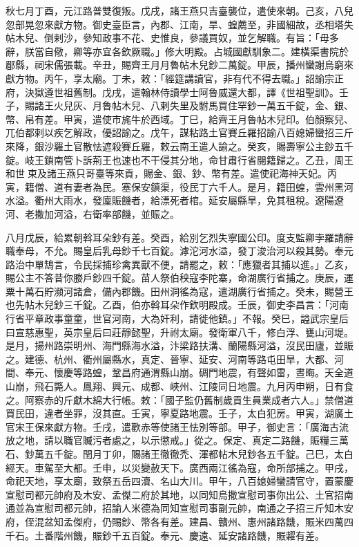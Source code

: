 \begin{pinyinscope}
 秋七月丁酉，元江路普雙復叛。戊戌，諸王燕只吉臺襲位，遣使來朝。己亥，八兒忽部晃忽來獻方物。御史臺臣言，內郡、江南，旱、蝗薦至，非國細故，丞相塔失帖木兒、倒剌沙，參知政事不花、史惟良，參議買奴，並乞解職。有旨：「毋多辭，朕當自儆，卿等亦宜各欽厥職。」修大明殿。占城國獻馴象二。建橫渠書院於郿縣，祠宋儒張載。辛丑，賜齊王月月魯帖木兒鈔二萬錠。甲辰，播州蠻謝烏窮來獻方物。丙午，享太廟。丁未，敕：「經筵講讀官，非有代不得去職。」詔諭宗正府，決獄遵世祖舊制。戊戌，遣翰林侍讀學士阿魯威還大都，譯《世祖聖訓》。壬子，賜諸王火兒灰、月魯帖木兒、八剌失里及駙馬買住罕鈔一萬五千錠，金、銀、幣、帛有差。甲寅，遣使市旄牛於西域。丁巳，給齊王月魯帖木兒印。伯顏察兒、兀伯都剌以疾乞解政，優詔諭之。戊午，謀粘路土官賽丘羅招諭八百媳婦蠻招三斤來降，銀沙羅土官散怯遮殺賽丘羅，敕云南王遣人諭之。癸亥，賜壽寧公主鈔五千錠。岐王鎖南管卜訴荊王也速也不干侵其分地，命甘肅行省閱籍歸之。乙丑，周王和世束及諸王燕只哥臺等來貢，賜金、銀、鈔、幣有差。遣使祀海神天妃。丙寅，籍僧、道有妻者為民。塞保安鎮渠，役民丁六千人。是月，籍田蝗，雲州黑河水溢。衢州大雨水，發廩賑饑者，給漂死者棺。延安屬縣旱，免其租稅。遼陽遼河、老撒加河溢，右衛率部饑，並賑之。



 八月戊辰，給累朝斡耳朵鈔有差。癸酉，給別乞烈失寧國公印。度支監卿孛羅請辭職奉母，不允。賜皇后乳母鈔千七百錠。滹沱河水溢，發丁浚治河以殺其勢。奉元路治中單鵠言，令民採捕珍禽異獸不便，請罷之，敕：「應獵者其捕以進。」乙亥，賜公主不答昔你媵戶鈔四千錠。苗人祭伯秧寇李陀寨，命湖廣行省捕之。庚辰，運粟十萬石貯瀕河諸倉，備內郡饑。田州洞徭為寇，遣湖廣行省捕之。癸未，賜營王也先帖木兒鈔三千錠。乙酉，伯亦斡耳朵作欽明殿成。壬辰，御史李昌言：「河南行省平章政事童童，世官河南，大為奸利，請徙他鎮。」不報。癸巳，謚武宗皇后曰宣慈惠聖，英宗皇后曰莊靜懿聖，升祔太廟。發衛軍八千，修白浮、甕山河堤。是月，揚州路崇明州、海門縣海水溢，汴梁路扶溝、蘭陽縣河溢，沒民田廬，並賑之。建德、杭州、衢州屬縣水，真定、晉寧、延安、河南等路屯田旱，大都、河間、奉元、懷慶等路蝗，鞏昌府通渭縣山崩。碉門地震，有聲如雷，晝晦。天全道山崩，飛石斃人。鳳翔、興元、成都、峽州、江陵同日地震。九月丙申朔，日有食之。阿察赤的斤獻木綿大行帳。敕：「國子監仍舊制歲貢生員業成者六人。」禁僧道買民田，違者坐罪，沒其直。壬寅，寧夏路地震。壬子，太白犯房。甲寅，湖廣土官宋王保來獻方物。壬戌，遣歡赤等使諸王怯別等部。甲子，御史言：「廣海古流放之地，請以職官贓污者處之，以示懲戒。」從之。保定、真定二路饑，賑糧三萬石、鈔萬五千錠。閏月丁卯，賜諸王徹徹禿、渾都帖木兒鈔各五千錠。己巳，太白經天。車駕至大都。壬申，以災變赦天下。廣西兩江徭為寇，命所部捕之。甲戌，命祀天地，享太廟，致祭五岳四瀆、名山大川。甲午，八百媳婦蠻請官守，置蒙慶宣慰司都元帥府及木安、孟傑二府於其地，以同知烏撒宣慰司事你出公、土官招南通並為宣慰司都元帥，招諭人米德為同知宣慰司事副元帥，南通之子招三斤知木安府，侄混盆知孟傑府，仍賜鈔、幣各有差。建昌、贛州、惠州諸路饑，賑米四萬四千石。土番階州饑，賑鈔千五百錠。奉元、慶遠、延安諸路饑，賑糶有差。




\end{pinyinscope}
